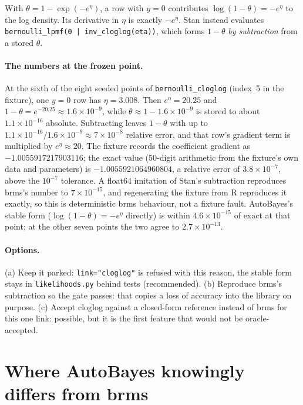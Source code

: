 \documentclass[11pt]{article}
\newcommand{\code}[1]{\texttt{#1}}
\newcommand{\file}[1]{\texttt{#1}}
\begin{document}
With $\theta = 1 - \exp(-e^{\eta})$, a row with $y = 0$ contributes $\log(1-\theta) = -e^{\eta}$ to the log density.
Its derivative in $\eta$ is exactly $-e^{\eta}$. Stan instead evaluates \code{bernoulli\_lpmf(0 | inv\_cloglog(eta))},
which forms $1-\theta$ \emph{by subtraction} from a stored $\theta$.

\paragraph{The numbers at the frozen point.} At the sixth of the eight seeded points of \file{bernoulli\_cloglog}
(index~5 in the fixture), one $y = 0$ row has $\eta = 3.008$. Then $e^{\eta} = 20.25$ and
$1-\theta = e^{-20.25} \approx 1.6\times 10^{-9}$, while $\theta \approx 1 - 1.6\times10^{-9}$ is stored to about
$1.1\times 10^{-16}$ absolute. Subtracting leaves $1-\theta$ with up to $1.1\times10^{-16}/1.6\times10^{-9} \approx
7\times 10^{-8}$ relative error, and that row's gradient term is multiplied by $e^{\eta} \approx 20$. The fixture
records the coefficient gradient as $-1.0055917217903116$; the exact value (50-digit arithmetic from the fixture's own
data and parameters) is $-1.0055921064960804$, a relative error of $3.8\times10^{-7}$, above the $10^{-7}$ tolerance.
A float64 imitation of Stan's subtraction reproduces brms's number to $7\times10^{-15}$, and regenerating the fixture
from R reproduces it exactly, so this is deterministic brms behaviour, not a fixture fault. AutoBayes's stable form
($\log(1-\theta) = -e^\eta$ directly) is within $4.6\times10^{-15}$ of exact at that point; at the other seven points
the two agree to $2.7\times10^{-13}$.

\paragraph{Options.} (a) Keep it parked: \code{link="cloglog"} is refused with this reason, the stable form stays in
\file{likelihoods.py} behind tests (recommended). (b) Reproduce brms's subtraction so the gate passes: that copies a
loss of accuracy into the library on purpose. (c) Accept cloglog against a closed-form reference instead of brms for
this one link: possible, but it is the first feature that would not be oracle-accepted.

\section{Where AutoBayes knowingly differs from brms}
\label{sec:divergences}
\end{document}

